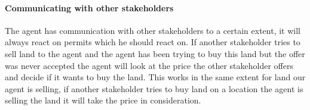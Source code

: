 \paragraph{Communicating with other stakeholders}
The agent has communication with other stakeholders to a certain extent, it will always react on permits which he should react on. If another stakeholder tries to sell land to the agent and the agent has been trying to buy this land but the offer was never accepted the agent will look at the price the other stakeholder offers and decide if it wants to buy the land. This works in the same extent for land our agent is selling, if another stakeholder tries to buy land on a location the agent is selling the land it will take the price in consideration. 